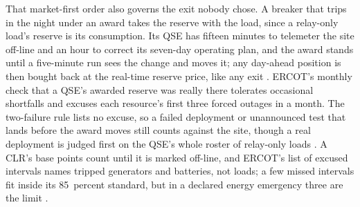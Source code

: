 That market-first order also governs the exit nobody chose. A breaker that trips in the night under an award takes the reserve with the load, since a relay-only load's reserve is its consumption. Its QSE has fifteen minutes to telemeter the site off-line and an hour to correct its seven-day operating plan, and the award stands until a five-minute run sees the change and moves it; any day-ahead position is then bought back at the real-time reserve price, like any exit \autocite{ercot2026protocols}. %
ERCOT's monthly check that a QSE's awarded reserve was really there tolerates occasional shortfalls and excuses each resource's first three forced outages in a month. The two-failure rule lists no excuse, so a failed deployment or unannounced test that lands before the award moves still counts against the site, though a real deployment is judged first on the QSE's whole roster of relay-only loads \autocite{ercot2026protocols}. %
A CLR's base points count until it is marked off-line, and ERCOT's list of excused intervals names tripped generators and batteries, not loads; a few missed intervals fit inside its 85~percent standard, but in a declared energy emergency three are the limit \autocite{ercot2026protocols}. %
